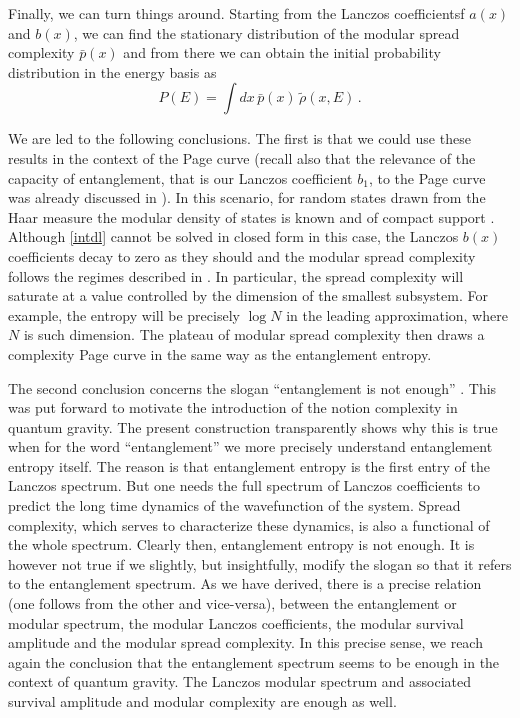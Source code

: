 \documentclass[aps,prl,twocolumn,showpacs,preprintnumbers,amsmath,amssymb]{revtex4-1}
\def\be{\begin{equation}}
\def\ee{\end{equation}}
\begin{document}
Finally, we can turn things around. Starting from the Lanczos coefficientsf $a(x)$ and $b(x)$, we can find the stationary distribution of the modular spread complexity $\bar{p}(x)$ and from there we can obtain the initial probability distribution in the energy basis as
\be
P(E) = \int dx \,\bar{p}(x)\,\tilde{\rho}(x,E)\,.
\ee

We are led to the following conclusions. The first is that we could use these results in the context of the Page curve \cite{Page:1993df} (recall also that the relevance of the capacity of entanglement, that is our Lanczos coefficient $b_1$, to the Page curve was already discussed in \cite{Kawabata:2021vyo,Okuyama:2021ylc}). In this scenario, for random states drawn from the Haar measure the modular density of states is known and of compact support \cite{Page:1993df}. Although \eqref{intdl} cannot be solved in closed form in this case, the Lanczos $b(x)$ coefficients decay to zero as they should and the modular spread complexity follows the regimes described in \cite{Balasubramanian:2022tpr}. In particular, the spread complexity will saturate at a value controlled by the dimension of the smallest subsystem. For example, the entropy will be precisely $\log N$ in the leading approximation, where $N$ is such dimension. The plateau of modular spread complexity then draws a complexity Page curve in the same way as the entanglement entropy.

The second conclusion concerns the slogan ``entanglement is not enough'' \cite{Susskind:2014moa}. This was put forward to motivate the introduction of the notion complexity in quantum gravity. The present construction transparently shows why this is true when for the word ``entanglement'' we more precisely understand entanglement entropy itself. The reason is that entanglement entropy is the first entry of the Lanczos spectrum. But one needs the full spectrum of Lanczos coefficients to predict the long time dynamics of the wavefunction of the system. Spread complexity, which serves to characterize these dynamics, is also a functional of the whole spectrum. Clearly then, entanglement entropy is not enough. It is however not true if we slightly, but insightfully, modify the slogan so that it refers to the entanglement spectrum. As we have derived, there is a precise relation (one follows from the other and vice-versa), between the entanglement or modular spectrum, the modular Lanczos coefficients, the modular survival amplitude and the modular spread complexity. In this precise sense, we reach again the conclusion that the entanglement spectrum seems to be enough in the context of quantum gravity. The Lanczos modular spectrum and associated survival amplitude and modular complexity are enough as well.
\end{document}
